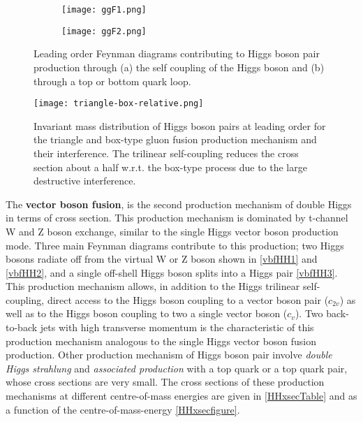 \begin{figure*}[ht]
        \centering
        \begin{subfigure}[b]{0.475\textwidth}
            \centering
            \texttt{[image: ggF1.png]}
            \vspace{-0.5cm}
        \end{subfigure}
        \hspace{0.2cm}
        \begin{subfigure}[b]{0.475\textwidth}  
            \centering 
            \texttt{[image: ggF2.png]}
            \vspace{-0.5cm}
        \end{subfigure}
        \caption[]
        {\small Leading order Feynman diagrams contributing to Higgs boson pair production through (a) the self coupling of the Higgs boson and (b) through a top or bottom quark loop.}
        \label{ggF-HH}
\end{figure*}

\begin{figure}[ht]
	\centering
	\texttt{[image: triangle-box-relative.png]}
	\caption[Invariant mass distribution of Higgs boson pairs at leading order for the triangle and box-type gluon fusion production mechanism and their interference.]{Invariant mass distribution of Higgs boson pairs at leading order for the triangle and box-type gluon fusion production mechanism and their interference. The trilinear self-coupling reduces the cross section about a half w.r.t. the box-type process due to the large destructive interference\cite{DiMicco:2690841}.}
	\label{triangle-box-relative}
\end{figure}

The \textbf{vector boson fusion}, is the second production mechanism of double Higgs in terms of cross section. This production mechanism is dominated by t-channel W and Z boson exchange, similar to the single Higgs vector boson production mode. Three main Feynman diagrams contribute to this production; two Higgs bosons radiate off from the virtual W or Z boson shown in \autoref{vbfHH1} and \autoref{vbfHH2}, and a single off-shell Higgs boson splits into a Higgs pair \autoref{vbfHH3}. This production mechanism allows, in addition to the Higgs trilinear self-coupling, direct access to the Higgs boson coupling to a vector boson pair ($c_{2v}$) as well as to the Higgs boson coupling to two a single vector boson ($c_v$). Two back-to-back jets with high transverse momentum is the characteristic of this production mechanism analogous to the single Higgs vector boson fusion production. Other production mechanism of Higgs boson pair involve \emph{double Higgs strahlung} and \emph{associated production} with a top quark or a top quark pair, whose cross sections are very small. The cross sections of these production mechanisms at different centre-of-mass energies are given in \autoref{HHxsecTable} and as a function of the centre-of-mass-energy \autoref{HHxsecfigure}.

